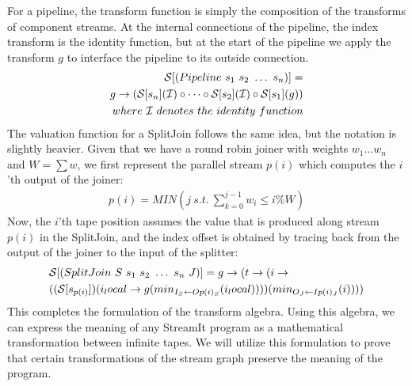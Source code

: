 For a pipeline, the transform function is simply the composition of the
transforms of component streams.  At the internal connections of the
pipeline, the index transform is the identity function, but at the start
of the pipeline we apply the transform $g$ to interface the pipeline to
its outside connection.
\begin{align*}
{\cal S} [(Pipeline~s_1~s_2~\dots~s_n)] = \\
g \ra ({\cal S}[s_n]({\cal I}) \circ \dots \circ {\cal S}[s_2]({\cal I}) \circ {\cal S}[s_1](g)) \\
where~{\cal I}~denotes~the~identity~function
\end{align*}
The valuation function for a SplitJoin follows the same idea, but the
notation is slightly heavier.  Given that we have a round robin joiner
with weights $w_1 \dots w_n$ and $W = \sum{w}$, we first represent the
parallel stream $p(i)$ which computes the $i$'th output of the
joiner:
\begin{align}
\label{eq:p}
p(i) = MIN(j~s.t.~\sum_{k=0}^{j-1}{w_i} \le i\%W)
\end{align}
Now, the $i$'th tape position assumes the value that is produced along
stream $p(i)$ in the SplitJoin, and the index offset is obtained by
tracing back from the output of the joiner to the input of the splitter:
\begin{align*}
&{\cal S} [(SplitJoin~S~s_1~s_2~\dots~s_n~J)] = g \ra (t \ra (i \ra \\
&(({\cal S}[s_{p(i)}])(i_local \ra
g(\mi{I_S}{Op(i)_S}(i_local))))(\mi{O_J}{Ip(i)_J}(i))))
\end{align*}
This completes the formulation of the transform algebra.  Using this
algebra, we can express the meaning of any StreamIt program as a
mathematical transformation between infinite tapes.  We will utilize
this formulation to prove that certain transformations of the stream
graph preserve the meaning of the program.

